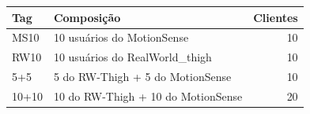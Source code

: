 \begin{tabular}{llr}
\toprule
\textbf{Tag} & \textbf{Composição} & \textbf{Clientes} \\
\midrule
MS10 & 10 usuários do MotionSense & 10 \\
RW10 & 10 usuários do RealWorld\_thigh & 10 \\
5+5 & 5 do RW-Thigh + 5 do MotionSense & 10 \\
10+10 & 10 do RW-Thigh + 10 do MotionSense & 20 \\
\bottomrule
\end{tabular}
